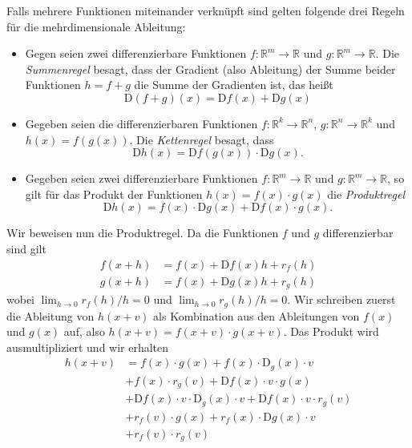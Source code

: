 Falls mehrere Funktionen miteinander verknüpft sind gelten folgende drei Regeln f\"ur die mehrdimensionale Ableitung:
\begin{itemize}
\item Gegen seien zwei differenzierbare Funktionen $f:\mathbb{R}^m\rightarrow\mathbb{R}$ und $g:\mathbb{R}^m\rightarrow\mathbb{R}$. Die \emph{Summenregel} besagt, dass der Gradient (also Ableitung) der Summe beider Funktionen $h = f + g$ die Summe der Gradienten ist, das heißt
\begin{equation*} \text{D}(f + g)(x)=\text{D} f(x)+\text{D} g(x)\end{equation*}

\item Gegeben seien die differenzierbaren Funktionen $f:\mathbb{R}^k\rightarrow\mathbb{R}^n$, $g:\mathbb{R}^n\rightarrow\mathbb{R}^k$ und $h(x)=f(g(x))$. Die \emph{Kettenregel} besagt, dass
\begin{equation*}
\text{D}h(x) = \text{D}f(g(x)) \cdot \text{D} g(x).
\end{equation*}

\item Gegeben seien zwei differenzierbare Funktionen $f:\mathbb{R}^m\rightarrow\mathbb{R}$ und $g:\mathbb{R}^m\rightarrow\mathbb{R}$, so gilt für das Produkt der Funktionen $h(x)=f(x) \cdot g(x)$ die \emph{Produktregel} \begin{equation*}\text{D}h(x)=f(x) \cdot \text{D}g(x)+\text{D}f(x) \cdot g(x).\end{equation*}
 \end{itemize}
Wir beweisen nun die Produktregel.
Da die Funktionen $f$ und $g$ differenzierbar sind gilt
\begin{align*}
  f(x+h) &= f(x) +  \text{D}f(x) h + r_{f}(h)\\
  g(x+h) &= f(x) + \text{D}g(x) h + r_{g}(h)
\end{align*}
wobei $\lim_{h\rightarrow 0} r_f(h)/h = 0$ und $\lim_{h\rightarrow 0} r_g(h)/h = 0$.
Wir schreiben zuerst die Ableitung von $h(x+v)$ als Kombination aus den Ableitungen von $f(x)$ und $g(x)$ auf, also $h(x+v) =  f(x+v)\cdot g(x+v)$.
Das Produkt wird ausmultipliziert und wir erhalten
\begin{equation*}
\begin{split} h(x+v) & = f(x) \cdot g(x)  + f(x)  \cdot \text{D}_{g}(x) \cdot v \\ & + f(x) \cdot r_{g}(v) + \text{D}f(x) \cdot v \cdot g(x) \\ & +  \text{D}f(x) \cdot v \cdot \text{D}_{g}(x) \cdot v  + \text{D}f(x) \cdot v \cdot r_{g}(v) \\ & +  r_{f}(v) \cdot g(x) + r_{f}(x) \cdot \text{D} g(x) \cdot v \\ & + r_{f}(v) \cdot r_{g}(v) \end{split} \end{equation*}   %

